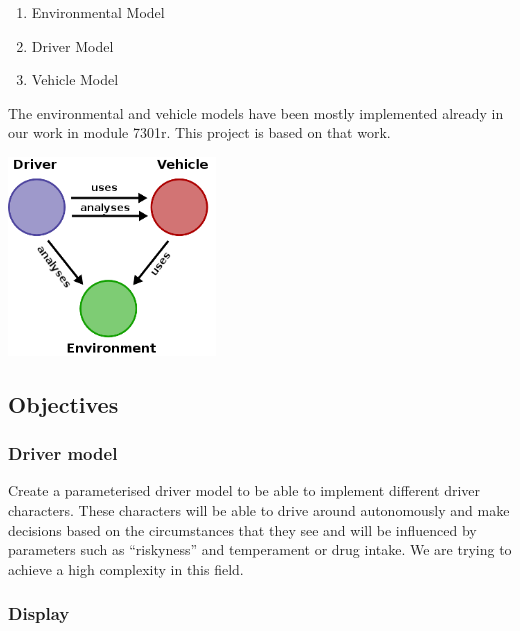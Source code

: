 \documentclass[a4paper,10pt,titlepage]{article}
\begin{document}
\begin{enumerate}
 \item Environmental Model%
 \item Driver Model%
 \item Vehicle Model%
\end{enumerate}
The environmental and vehicle models have been mostly implemented already in our work in module 7301r. This project is based on that work.

\begin{center}
\includegraphics[width=5.5cm]{skizze.png}
\end{center}

\subsection{Objectives}
\subsubsection{Driver model}
 Create a parameterised driver model to be able to implement different 
 driver characters. These characters will be able to drive around autonomously 
 and make decisions based on the circumstances that they see and will be 
 influenced by parameters such as ``riskyness'' and temperament or drug intake.
 We are trying to achieve a high complexity in this field.




\subsubsection{Display}
\end{document}
